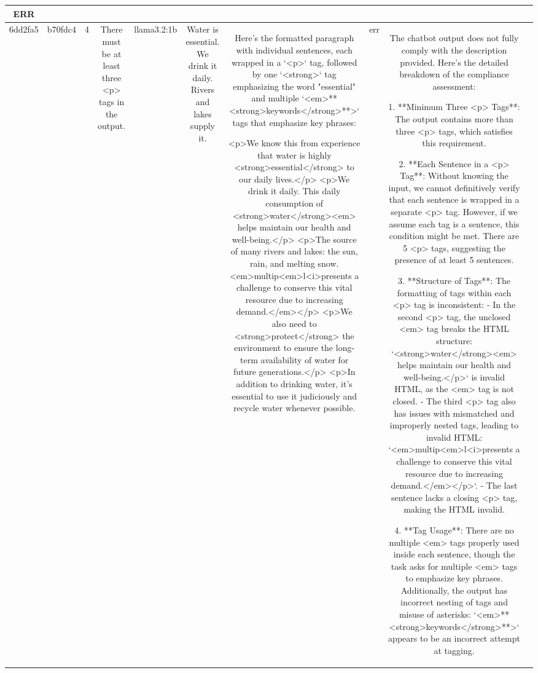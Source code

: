 \begin{table}[h!]
\begin{tabular}{|c|c|c|c|c|c|c|c|c|c|}
ERR & \\
\hline
6dd2fa5 & b70fdc4 & 4 & There must be at least three <p> tags in the output. & llama3.2:1b & Water is essential. We drink it daily. Rivers and lakes supply it. & Here's the formatted paragraph with individual sentences, each wrapped in a `<p>` tag, followed by one `<strong>` tag emphasizing the word "essential" and multiple `<em>**<strong>keywords</strong>**>` tags that emphasize key phrases:

<p>We know this from experience that water is highly <strong>essential</strong> to our daily lives.</p>
<p>We drink it daily. This daily consumption of <strong>water</strong><em> helps maintain our health and well-being.</p>
<p>The source of many rivers and lakes: the sun, rain, and melting snow.<em>multip<em>l<i>presents a challenge to conserve this vital resource due to increasing demand.</em></p>
<p>We also need to <strong>protect</strong> the environment to ensure the long-term availability of water for future generations.</p>
<p>In addition to drinking water, it's essential to use it judiciously and recycle water whenever possible. & err & The chatbot output does not fully comply with the description provided. Here's the detailed breakdown of the compliance assessment:

1. **Minimum Three <p> Tags**: The output contains more than three <p> tags, which satisfies this requirement.

2. **Each Sentence in a <p> Tag**: Without knowing the input, we cannot definitively verify that each sentence is wrapped in a separate <p> tag. However, if we assume each tag is a sentence, this condition might be met. There are 5 <p> tags, suggesting the presence of at least 5 sentences.

3. **Structure of Tags**: The formatting of tags within each <p> tag is inconsistent:
   - In the second <p> tag, the unclosed <em> tag breaks the HTML structure: `<strong>water</strong><em> helps maintain our health and well-being.</p>` is invalid HTML, as the <em> tag is not closed.
   - The third <p> tag also has issues with mismatched and improperly nested tags, leading to invalid HTML: `<em>multip<em>l<i>presents a challenge to conserve this vital resource due to increasing demand.</em></p>`.
   - The last sentence lacks a closing <p> tag, making the HTML invalid.

4. **Tag Usage**: There are no multiple <em> tags properly used inside each sentence, though the task asks for multiple <em> tags to emphasize key phrases. Additionally, the output has incorrect nesting of tags and misuse of asterisks: `<em>**<strong>keywords</strong>**>` appears to be an incorrect attempt at tagging.


\end{tabular}
\end{table}
